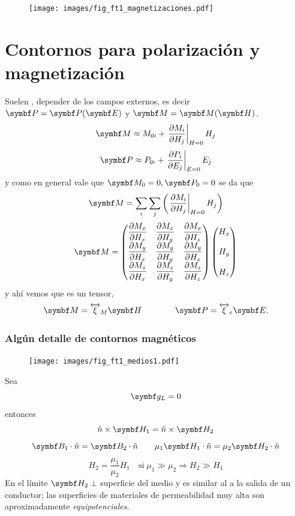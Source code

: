 \documentclass[10pt,oneside]{CBFT_book}
\begin{document}
\begin{figure}[htb]
	\begin{center}
	\texttt{[image: images/fig\_ft1\_magnetizaciones.pdf]}	 
	\end{center}
	\caption{}
\end{figure}


\section{Contornos para polarización y magnetización}

Suelen , depender de los campos externos, es decir $\vb{P}=\vb{P}(\vb{E})$ y 
$\vb{M}=\vb{M}(\vb{H})$.
\[
	\vb{M} \approx M_{0i} + \left.\dpar{M_i}{H_j}\right|_{H=0} H_j
\]
\[
	\vb{P} \approx P_{0i} + \left.\dpar{P_i}{E_j}\right|_{E=0} E_j
\]
y como en general vale que $\vb{M}_0=0, \vb{P}_0=0$  se da que 
\[
	\vb{M} = \sum_i \sum_j \left( \left.\dpar{M_i}{H_j}\right|_{H=0} H_j \right) 
\]
\[
	\vb{M} = 
	\begin{pmatrix}
	 \displaystyle{\dpar{M_x}{H_x}} & \displaystyle{\dpar{M_x}{H_y}} & \displaystyle{\dpar{M_x}{H_z}} \\
	 \displaystyle{\dpar{M_y}{H_x}} & \displaystyle{\dpar{M_y}{H_y}} & \displaystyle{\dpar{M_y}{H_z}} \\
	 \displaystyle{\dpar{M_z}{H_x}} & \displaystyle{\dpar{M_z}{H_y}} & \displaystyle{\dpar{M_z}{H_z}}
	\end{pmatrix}
	\begin{pmatrix}
	 \displaystyle{H_x} \\
	 \\
	 H_y \\
	 \\
	 H_z
	\end{pmatrix}
\]
y ahí vemos que es un tensor,
\[
	\vb{M} = \overleftrightarrow{\xi}_M \vb{H} \qquad\qquad \vb{P} =  \overleftrightarrow{\xi}_e \vb{E}.
\]

\subsubsection{Algún detalle de contornos magnéticos}

\begin{figure}[htb]
	\begin{center}
	\texttt{[image: images/fig\_ft1\_medios1.pdf]}	 
	\end{center}
	\caption{}
\end{figure}
Sea
\[
	\vb{g}_L = 0 
\]
entonces
\[
	\hat{n}\times\vb{H}_1 = \hat{n}\times\vb{H}_2
\]
\[
	\vb{B}_1\cdot\hat{n} = \vb{B}_2\cdot\hat{n} \qquad
		\mu_1\vb{H}_1\cdot\hat{n} = \mu_2\vb{H}_2\cdot\hat{n}
\]
\[
	H_2 = \frac{\mu_1}{\mu_2} H_1 \quad \text{si} \; \mu_1 \gg \mu_2 \Rightarrow H_2 \gg H_1
\]
En el límite $\vb{H}_2 \perp$ superficie del medio y es similar al  a la salida de un
conductor; las superficies de materiales de permeabilidad muy alta son aproximadamente {\it equipotenciales}.
\end{document}

